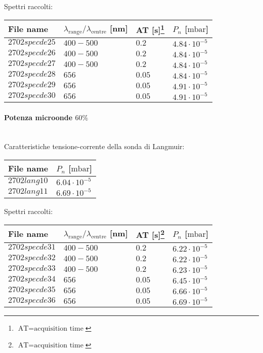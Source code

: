 Spettri raccolti:
\begin{center}
\begin{tabular}{p{3cm}p{4cm}p{2cm}p{3cm}}
\toprule
File name	&$\lambda_\text{range}\text{/}\lambda_\text{centre}$ [nm] 	&AT [s]\footnote{$\text{AT}=\text{acquisition time}$} &$P_n$ [$\si{\milli\bar}$]\\
\midrule
$2702specde25$	&$400-500$	&$0.2$		&$4.84\cdot10^{-5}$\\
$2702specde26$	&$400-500$	&$0.2$		&$4.84\cdot10^{-5}$\\
$2702specde27$	&$400-500$	&$0.2$		&$4.84\cdot10^{-5}$\\
$2702specde28$	&$656$		&$0.05$		&$4.84\cdot10^{-5}$\\
$2702specde29$	&$656$		&$0.05$		&$4.91\cdot10^{-5}$\\
$2702specde30$	&$656$		&$0.05$		&$4.91\cdot10^{-5}$\\
\bottomrule
\end{tabular}
\end{center}

\paragraph*{Potenza microonde $\text{60\%}$} ~\\
Caratteristiche tensione-corrente della sonda di Langmuir:
\begin{center}
\begin{tabular}{p{3cm}p{3cm}}
\toprule
File name	&$P_n$ [$\si{\milli\bar}$]\\
\midrule
$2702lang10$	&$6.04\cdot10^{-5}$\\
$2702lang11$	&$6.69\cdot10^{-5}$\\
\bottomrule
\end{tabular}
\end{center}

Spettri raccolti:
\begin{center}
\begin{tabular}{p{3cm}p{4cm}p{2cm}p{3cm}}
\toprule
File name	&$\lambda_\text{range}\text{/}\lambda_\text{centre}$ [nm] 	&AT [s]\footnote{$\text{AT}=\text{acquisition time}$} &$P_n$ [$\si{\milli\bar}$]\\
\midrule
$2702specde31$	&$400-500$	&$0.2$		&$6.22\cdot10^{-5}$\\
$2702specde32$	&$400-500$	&$0.2$		&$6.22\cdot10^{-5}$\\
$2702specde33$	&$400-500$	&$0.2$		&$6.23\cdot10^{-5}$\\
$2702specde34$	&$656$		&$0.05$		&$6.45\cdot10^{-5}$\\
$2702specde35$	&$656$		&$0.05$		&$6.66\cdot10^{-5}$\\
$2702specde36$	&$656$		&$0.05$		&$6.69\cdot10^{-5}$\\
\bottomrule
\end{tabular}
\end{center}